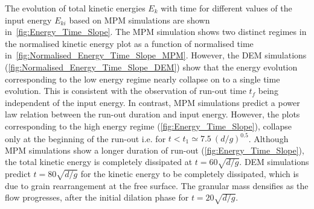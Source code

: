 \documentclass[3p,times,procedia,number]{elsarticle}
\begin{document}
The evolution of total kinetic energies $E_k$ with time for different values of 
the input energy $E_{ki}$ based on MPM simulations are shown 
in~\cref{fig:Energy_Time_Slope}. The MPM simulation shows two distinct regimes 
in the normalised kinetic energy plot as a function of normalised time 
in~\cref{fig:Normalised_Energy_Time_Slope_MPM}. However, the DEM simulations 
(\cref{fig:Normalised_Energy_Time_Slope_DEM}) show that the energy evolution 
corresponding to the low energy regime nearly collapse on to a single time 
evolution. This is consistent with the observation of run-out time $t_f$ being 
independent of the input energy. In contrast, MPM simulations predict a power 
law relation between the run-out duration and input energy. However, the 
plots corresponding to the high energy regime (\cref{fig:Energy_Time_Slope}), 
collapse only at the beginning of the run-out i.e. for $t < t_1 \simeq 7.5 \ 
(d/g)^{0.5}$. Although MPM simulations show a longer duration of run-out 
(\cref{fig:Energy_Time_Slope}), the total kinetic energy is completely 
dissipated at $t = 60 \sqrt{d/g}$. DEM simulations predict $t = 80 \sqrt{d/g}$ 
for the kinetic energy to be completely dissipated, which is due to grain 
rearrangement at the free surface. The granular mass densifies as the flow
progresses, after the initial dilation phase for $t = 20\sqrt{d/g}$.
\end{document}
